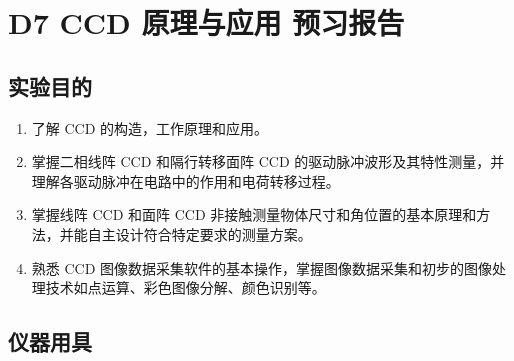 \documentclass[dvipsnames, svgnames,a4paper,11pt]{article}
\begin{document}
\clearpage
\tableofcontents
\clearpage

\setcounter{section}{0}
\section{D7 \quad CCD 原理与应用 \quad\heiti 预习报告}
	
\subsection{实验目的}
\begin{enumerate}
	\item 了解 CCD 的构造，工作原理和应用。
	\item 掌握二相线阵 CCD 和隔行转移面阵 CCD 的驱动脉冲波形及其特性测量，并理解各驱动脉冲在电路中的作用和电荷转移过程。
	\item 掌握线阵 CCD 和面阵 CCD 非接触测量物体尺寸和角位置的基本原理和方法，并能自主设计符合特定要求的测量方案。
	\item 熟悉 CCD 图像数据采集软件的基本操作，掌握图像数据采集和初步的图像处理技术如点运算、彩色图像分解、颜色识别等。
	
\end{enumerate}

\subsection{仪器用具}



		
		

\end{document}
